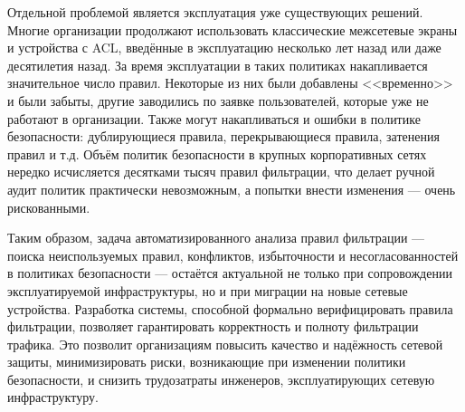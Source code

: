 Отдельной проблемой является эксплуатация уже существующих решений. Многие организации продолжают использовать классические межсетевые экраны и устройства с ACL, введённые в эксплуатацию несколько лет назад или даже десятилетия назад. За время эксплуатации в таких политиках накапливается значительное число правил. Некоторые из них были добавлены <<временно>> и были забыты, другие заводились по заявке пользователей, которые уже не работают в организации. Также могут накапливаться и ошибки в политике безопасности: дублирующиеся правила, перекрывающиеся правила, затенения правил и т.д. Объём политик безопасности в крупных корпоративных сетях нередко исчисляется десятками тысяч правил фильтрации, что делает ручной аудит политик практически невозможным, а попытки внести изменения — очень рискованными.

Таким образом, задача автоматизированного анализа правил фильтрации — поиска неиспользуемых правил, конфликтов, избыточности и несогласованностей в политиках безопасности — остаётся актуальной не только при сопровождении эксплуатируемой инфраструктуры, но и при миграции на новые сетевые устройства. Разработка системы, способной формально верифицировать правила фильтрации, позволяет гарантировать корректность и полноту фильтрации трафика. Это позволит организациям повысить качество и надёжность сетевой защиты, минимизировать риски, возникающие при изменении политики безопасности, и снизить трудозатраты инженеров, эксплуатирующих сетевую инфраструктуру.

\newpage